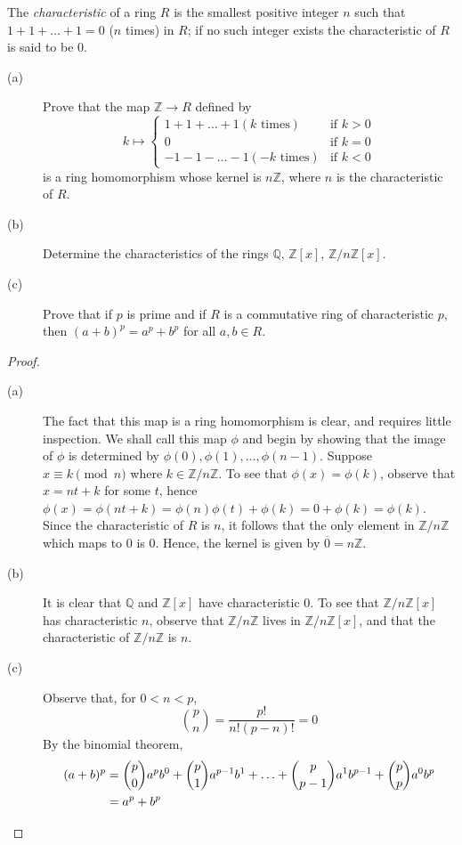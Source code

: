 \documentclass[12pt,leqno]{book}
\numberwithin{equation}{section}
\newcommand{\question}[2] {\vspace{.25in}\noindent\fbox{#1} #2 \vspace{.10in}}
\theoremstyle{definition}
\begin{document}
\question{26}{The \textit{characteristic} of a ring $R$ is the smallest positive integer $n$ such that $1+1+\hdots+1=0$ ($n$ times) in $R$; if no such integer exists the characteristic of $R$ is said to be 0.}
\begin{description}
 \item [(a)] Prove that the map $\mathbb{Z}\to R$ defined by \[k\mapsto\begin{cases}1+1+\hdots+1(k\text{ times})&\text{if }k>0\\0&\text{if }k=0\\-1-1-\hdots-1(-k\text{ times})&\text{if }k<0\end{cases}\]is a ring homomorphism whose kernel is $n\mathbb{Z}$, where $n$ is the characteristic of $R$.
 \item [(b)] Determine the characteristics of the rings $\mathbb{Q}$, $\mathbb{Z}[x]$, $\mathbb{Z}/n\mathbb{Z}[x]$.
 \item [(c)] Prove that if $p$ is prime and if $R$ is a commutative ring of characteristic $p$, then $(a+b)^p=a^p+b^p$ for all $a,b\in R$.
\end{description}

\begin{proof}\indent
 \begin{description}
  \item [(a)] The fact that this map is a ring homomorphism is clear, and requires little inspection. We shall call this map $\phi$ and begin by showing that the image of $\phi$ is determined by $\phi(0),\phi(1),\hdots,\phi(n-1)$. Suppose $x\equiv k\pmod{n}$ where $k\in\mathbb{Z}/n\mathbb{Z}$. To see that $\phi(x)=\phi(k)$, observe that $x=nt+k$ for some $t$, hence $\phi(x)=\phi(nt+k)=\phi(n)\phi(t)+\phi(k)=0+\phi(k)=\phi(k)$. Since the characteristic of $R$ is $n$, it follows that the only element in $\mathbb{Z}/n\mathbb{Z}$ which maps to 0 is 0. Hence, the kernel is given by $\overline{0}=n\mathbb{Z}$.
  \item [(b)] It is clear that $\mathbb{Q}$ and $\mathbb{Z}[x]$ have characteristic 0. To see that $\mathbb{Z}/n\mathbb{Z}[x]$ has characteristic $n$, observe that $\mathbb{Z}/n\mathbb{Z}$ lives in $\mathbb{Z}/n\mathbb{Z}[x]$, and that the characteristic of $\mathbb{Z}/n\mathbb{Z}$ is $n$.
  \item [(c)] Observe that, for $0<n<p$, \[{p\choose n}=\frac{p!}{n!(p-n)!}=0\] By the binomial theorem, \begin{align*}(a+b)^p&={p\choose0}a^pb^0+{p\choose 1}a^{p-1}b^1+\hdots+{p\choose p-1}a^1b^{p-1}+{p\choose p}a^0b^p\\&=a^p+b^p\qedhere\end{align*}
 \end{description}

\end{proof}
\end{document}
